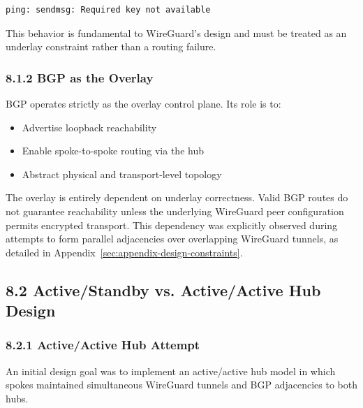 \documentclass[11pt]{article}
\begin{document}
\begin{verbatim}
ping: sendmsg: Required key not available
\end{verbatim}

This behavior is fundamental to WireGuard’s design and must be treated as an underlay constraint rather than a routing failure.

\subsubsection{8.1.2 BGP as the Overlay}
\label{subsubsec:bgp-overlay}

BGP operates strictly as the overlay control plane. Its role is to:
\begin{itemize}
\item Advertise loopback reachability
\item Enable spoke-to-spoke routing via the hub
\item Abstract physical and transport-level topology
\end{itemize}

The overlay is entirely dependent on underlay correctness. Valid BGP routes do not guarantee reachability unless the underlying WireGuard peer configuration permits encrypted transport. This dependency was explicitly observed during attempts to form parallel adjacencies over overlapping WireGuard tunnels, as detailed in Appendix~\ref{sec:appendix-design-constraints}.

\subsection{8.2 Active/Standby vs. Active/Active Hub Design}
\label{subsec:active-standby-vs-active-active}

%
%
\subsubsection{8.2.1 Active/Active Hub Attempt}
\label{subsubsec:active-active-attempt}

An initial design goal was to implement an active/active hub model in which spokes maintained simultaneous WireGuard tunnels and BGP adjacencies to both hubs.
\end{document}
